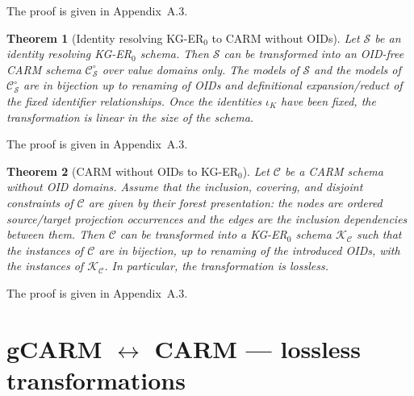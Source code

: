 \documentclass[10pt]{article}
\newtheorem{theorem}{Theorem}
\begin{document}
The proof is given in Appendix~A.3.


\begin{theorem}[Identity resolving KG-ER$_0$ to \textsf{CARM} without OIDs]
\label{thm:kgerzero-to-carm-no-oids}
Let $\mathcal S$ be an identity resolving KG-ER$_0$ schema.  
Then $\mathcal S$ can be transformed into an OID-free \textsf{CARM}
schema $\mathcal C^\circ_{\mathcal S}$ over value domains only.  The
models of $\mathcal S$ and the models of
$\mathcal C^\circ_{\mathcal S}$ are in bijection up to renaming of OIDs
and definitional expansion/reduct of the fixed identifier relationships.
Once the identities $\iota_K$ have been fixed, the transformation is
linear in the size of the schema.
\end{theorem}

The proof is given in Appendix~A.3.


\begin{theorem}[\textsf{CARM} without OIDs to KG-ER$_0$]\label{thm:carm-to-kgerzero}
Let $\mathcal C$ be a \textsf{CARM} schema without OID domains.  Assume
that the inclusion, covering, and disjoint constraints of $\mathcal C$
are given by their forest presentation: the nodes are ordered
source/target projection occurrences and the edges are the inclusion
dependencies between them.  Then $\mathcal C$ can be transformed into a
KG-ER$_0$ schema $\mathcal K_{\mathcal C}$ such that the instances of
$\mathcal C$ are in bijection, up to renaming of the introduced OIDs,
with the instances of $\mathcal K_{\mathcal C}$.  In particular, the
transformation is lossless.
\end{theorem}

The proof is given in Appendix~A.3.



\section{\textsf{gCARM} $\leftrightarrow$ \textsf{CARM} --- lossless transformations}
\end{document}
